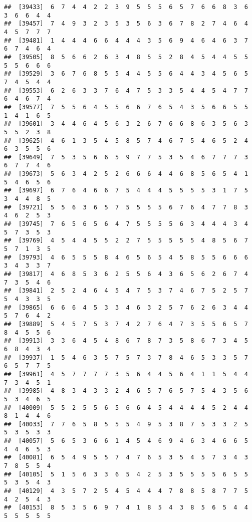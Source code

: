 \documentclass[
]{book}
\begin{document}
\begin{verbatim}
##  [39433]  6  7  4  4  2  2  3  9  5  5  5  6  5  7  6  6  8  3  6  3  6  6  4  4
##  [39457]  7  4  9  3  2  3  5  3  5  6  3  6  7  8  2  7  4  6  4  4  5  7  7  7
##  [39481]  1  4  4  4  6  6  4  4  4  3  5  6  9  4  6  4  6  3  7  6  7  4  6  4
##  [39505]  8  5  6  6  2  6  3  4  8  5  5  2  8  4  5  4  4  5  5  5  5  6  6  6
##  [39529]  3  6  7  6  8  5  5  4  4  5  5  6  4  4  3  4  5  6  5  7  4  5  4  4
##  [39553]  6  2  6  3  3  7  6  4  7  5  3  3  5  4  4  5  4  7  7  6  4  6  7  4
##  [39577]  7  5  5  6  4  5  5  6  6  7  6  5  4  3  5  6  6  5  5  1  4  1  6  5
##  [39601]  3  4  4  6  4  5  6  3  2  6  7  6  6  8  6  3  5  6  3  5  5  2  3  8
##  [39625]  4  6  1  3  5  4  5  8  5  7  4  6  7  5  4  6  5  2  4  6  3  5  5  6
##  [39649]  7  5  3  5  6  6  5  9  7  7  5  3  5  4  6  7  7  7  3  6  7  7  4  6
##  [39673]  5  6  3  4  2  5  2  6  6  6  4  4  6  8  5  6  5  4  1  5  4  6  5  6
##  [39697]  6  7  6  4  6  6  7  5  4  4  4  5  5  5  5  3  1  7  5  3  4  4  8  5
##  [39721]  5  5  6  3  6  5  7  5  5  5  5  6  7  6  4  7  7  8  3  4  6  2  5  3
##  [39745]  7  6  5  6  5  6  4  7  5  5  5  5  6  3  4  4  4  3  4  5  7  3  5  3
##  [39769]  4  5  4  4  5  5  2  2  7  5  5  5  5  5  4  8  5  6  7  5  7  1  3  5
##  [39793]  4  6  5  5  5  8  4  6  5  6  5  4  5  8  5  5  6  6  6  3  4  3  3  7
##  [39817]  4  6  8  5  3  6  2  5  5  6  4  3  6  5  6  2  6  7  4  7  3  5  4  6
##  [39841]  2  5  2  4  6  4  5  4  7  5  3  7  4  6  7  5  2  5  7  5  4  3  3  5
##  [39865]  6  6  6  4  5  3  3  4  6  3  2  5  7  6  2  6  3  4  4  5  7  6  4  2
##  [39889]  5  4  5  7  5  3  7  4  2  7  6  4  7  3  5  5  6  5  7  8  4  5  5  6
##  [39913]  3  3  6  4  5  4  8  6  7  8  7  3  5  8  6  7  3  4  5  6  8  4  3  4
##  [39937]  1  5  4  6  3  5  7  5  7  3  7  8  4  6  5  3  3  5  7  6  5  7  7  5
##  [39961]  4  5  7  7  7  7  3  5  6  4  4  5  6  4  1  1  5  4  4  7  3  4  5  1
##  [39985]  4  8  3  4  3  3  2  4  6  5  7  6  5  7  5  4  3  5  6  5  3  4  6  5
##  [40009]  5  5  2  5  5  6  5  6  6  4  5  4  4  4  4  5  2  4  4  8  1  4  4  6
##  [40033]  7  7  6  5  8  5  5  5  4  9  5  3  8  7  5  3  3  2  5  5  3  5  3  3
##  [40057]  5  6  5  3  6  6  1  4  5  4  6  9  4  6  3  4  6  6  5  4  4  6  5  3
##  [40081]  6  5  4  9  5  5  7  4  7  6  5  3  5  4  5  7  3  4  3  7  8  5  5  4
##  [40105]  5  1  5  6  3  3  6  5  4  2  5  3  5  5  5  5  6  5  5  5  3  5  4  3
##  [40129]  4  3  5  7  2  5  4  5  4  4  4  7  8  8  5  8  7  7  5  4  2  5  4  3
##  [40153]  8  5  3  5  6  9  7  4  1  8  5  4  3  8  5  6  5  4  4  5  5  5  5  5

\end{verbatim}
\end{document}
